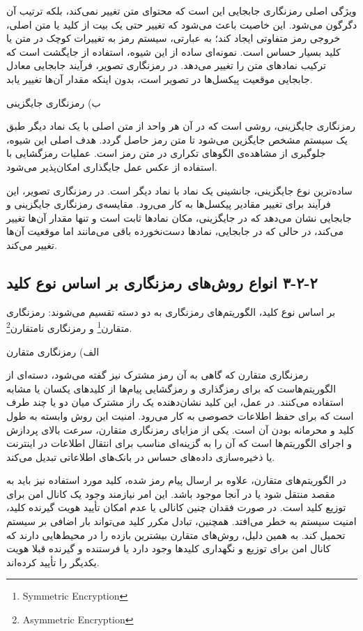 ویژگی اصلی رمزنگاری جابجایی این است که محتوای متن تغییر نمی‌کند، بلکه ترتیب آن دگرگون می‌شود. این خاصیت باعث می‌شود که تغییر حتی یک بیت از کلید یا متن اصلی، خروجی رمز متفاوتی ایجاد کند؛ به عبارتی، سیستم رمز به تغییرات کوچک در متن یا کلید بسیار حساس است. نمونه‌ای ساده از این شیوه، استفاده از جایگشت  است که ترکیب نمادهای متن را تغییر می‌دهد. در رمزنگاری تصویر، فرآیند جابجایی معادل جابجایی موقعیت پیکسل‌ها در تصویر است، بدون اینکه مقدار آن‌ها تغییر یابد\cite{ref23}.

ب) رمزنگاری جایگزینی

رمزنگاری جایگزینی، روشی است که در آن هر واحد از متن اصلی با یک نماد دیگر طبق یک سیستم مشخص جایگزین می‌شود تا متن رمز حاصل گردد. هدف اصلی این شیوه، جلوگیری از مشاهده‌ی الگوهای تکراری در متن رمز است. عملیات رمزگشایی با استفاده از عکس عمل جایگذاری امکان‌پذیر می‌شود.

ساده‌ترین نوع جایگزینی، جانشینی یک نماد با نماد دیگر است. در رمزنگاری تصویر، این فرآیند برای تغییر مقادیر پیکسل‌ها به کار می‌رود. مقایسه‌ی رمزنگاری جایگزینی و جابجایی نشان می‌دهد که در جایگزینی، مکان نمادها ثابت است و تنها مقدار آن‌ها تغییر می‌کند، در حالی که در جابجایی، نمادها دست‌نخورده باقی می‌مانند اما موقعیت آن‌ها تغییر می‌کند\cite{ref22, ref24}.

\subsection{‏۲‏-‏۲‏-‏۳‏ انواع روش‌های رمزنگاری بر اساس نوع کلید}

بر اساس نوع کلید، الگوریتم‌های رمزنگاری به دو دسته تقسیم می‌شوند: رمزنگاری متقارن\footnote{Symmetric Encryption} و رمزنگاری نامتقارن\footnote{Asymmetric Encryption}\cite{ref25}.

الف) رمزنگاری متقارن

رمزنگاری متقارن که گاهی به آن رمز مشترک نیز گفته می‌شود، دسته‌ای از الگوریتم‌هاست که برای رمزگذاری و رمزگشایی پیام‌ها از کلیدهای یکسان یا مشابه استفاده می‌کنند. در عمل، این کلید نشان‌دهنده یک راز مشترک میان دو یا چند طرف است که برای حفظ اطلاعات خصوصی به کار می‌رود. امنیت این روش وابسته به طول کلید و محرمانه بودن آن است. یکی از مزایای رمزنگاری متقارن، سرعت بالای پردازش و اجرای الگوریتم‌ها است که آن را به گزینه‌ای مناسب برای انتقال اطلاعات در اینترنت یا ذخیره‌سازی داده‌های حساس در بانک‌های اطلاعاتی تبدیل می‌کند\cite{ref26}.

در الگوریتم‌های متقارن، علاوه بر ارسال پیام رمز شده، کلید مورد استفاده نیز باید به مقصد منتقل شود یا در آنجا موجود باشد. این امر نیازمند وجود یک کانال امن برای توزیع کلید است. در صورت فقدان چنین کانالی یا عدم امکان تأیید هویت گیرنده کلید، امنیت سیستم به خطر می‌افتد. همچنین، تبادل مکرر کلید می‌تواند بار اضافی بر سیستم تحمیل کند. به همین دلیل، روش‌های متقارن بیشترین بازده را در محیط‌هایی دارند که کانال امن برای توزیع و نگهداری کلیدها وجود دارد یا فرستنده و گیرنده قبلا هویت یکدیگر را تأیید کرده‌اند.

